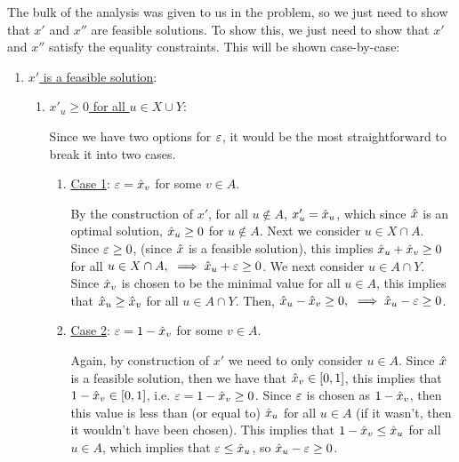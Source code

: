 \begin{solution}

    The bulk of the analysis was given to us in the problem, so we just need to show that $x'$ and $x''$ are feasible solutions. To show this, we just need to show that $x'$ and $x''$ satisfy the equality constraints. This will be shown case-by-case:
    \begin{enumerate}
        \item \underline{$x'$ is a feasible solution}:

        \hop 
        \begin{enumerate}
            \item \underline{$x'_u \geq 0$ for all $u \in X\cup Y$}:

            \hop
            Since we have two options for $\varepsilon$, it would be the most straightforward to break it into two cases.

            \begin{enumerate}
                \item \underline{Case 1}: $\varepsilon = \hat{x}_v$ for some $v \in A$.

                \hop
                By the construction of $x'$, for all $u \not \in A$, $x'_u = \hat{x}_u$, which since $\hat{x}$ is an optimal solution, $\hat{x}_u \geq 0 $ for $u \not \in A$. Next we consider $u \in X \cap A$. Since $\varepsilon \geq 0$, (since $\hat{x}$ is a feasible solution), this implies $\hat{x}_u + \hat{x}_v \geq 0$ for all $u \in X\cap A, \ \implies \hat{x}_u + \varepsilon \geq 0$. We next consider $u \in A \cap Y$. Since $\hat{x}_v$ is chosen to be the minimal value for all $u \in A$, this implies that $\hat{x}_u \geq \hat{x}_v$ for all $u \in A \cap Y$. Then, $\hat{x}_u - \hat{x}_v \geq 0, \ \implies \hat{x}_u - \varepsilon \geq 0$. 

                \item \underline{Case 2}: $\varepsilon = 1 - \hat{x}_v$ for some $v \in A$.

                \hop
                Again, by construction of $x'$ we need to only consider $u \in A$. Since $\hat{x}$ is a feasible solution, then we have that $\hat{x}_v \in [0, 1]$, this implies that $1 - \hat{x}_v \in [0, 1]$, i.e. $\varepsilon = 1 - \hat{x}_v \geq 0$. Since $\varepsilon$ is chosen as $1 - \hat{x}_v$, then this value is less than (or equal to) $\hat{x}_u$ for all $u \in A$ (if it wasn't, then it wouldn't have been chosen). This implies that $1 - \hat{x}_v \leq \hat{x}_u$ for all $u \in A$, which implies that $\varepsilon \leq \hat{x}_u$, so $\hat{x}_u - \varepsilon \geq 0$. \par
                

\end{enumerate}
\end{enumerate}
\end{enumerate}
\end{solution}
